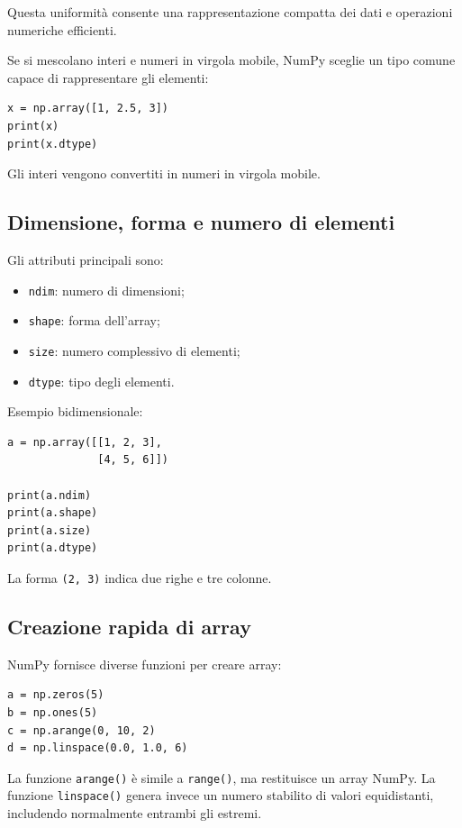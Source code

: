 \documentclass[11pt,a4paper]{book}
\begin{document}
Questa uniformità consente una rappresentazione compatta dei dati e operazioni numeriche efficienti.

Se si mescolano interi e numeri in virgola mobile, NumPy sceglie un tipo comune capace di rappresentare gli elementi:

\begin{lstlisting}[style=python]
x = np.array([1, 2.5, 3])
print(x)
print(x.dtype)
\end{lstlisting}

Gli interi vengono convertiti in numeri in virgola mobile.

\subsection{Dimensione, forma e numero di elementi}

Gli attributi principali sono:

\begin{itemize}
    \item \texttt{ndim}: numero di dimensioni;
    \item \texttt{shape}: forma dell'array;
    \item \texttt{size}: numero complessivo di elementi;
    \item \texttt{dtype}: tipo degli elementi.
\end{itemize}

Esempio bidimensionale:

\begin{lstlisting}[style=python]
a = np.array([[1, 2, 3],
              [4, 5, 6]])

print(a.ndim)
print(a.shape)
print(a.size)
print(a.dtype)
\end{lstlisting}

La forma \texttt{(2, 3)} indica due righe e tre colonne.

\subsection{Creazione rapida di array}

NumPy fornisce diverse funzioni per creare array:

\begin{lstlisting}[style=python]
a = np.zeros(5)
b = np.ones(5)
c = np.arange(0, 10, 2)
d = np.linspace(0.0, 1.0, 6)
\end{lstlisting}

La funzione \texttt{arange()} è simile a \texttt{range()}, ma restituisce un array NumPy. La funzione \texttt{linspace()} genera invece un numero stabilito di valori equidistanti, includendo normalmente entrambi gli estremi.
\end{document}
